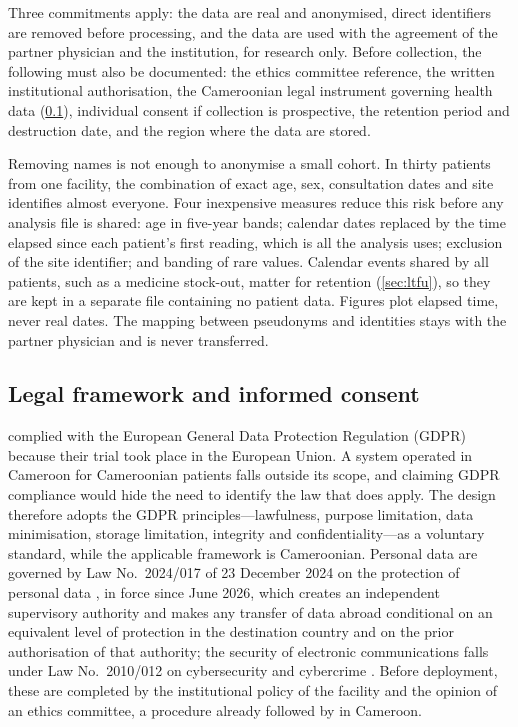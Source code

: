Three commitments apply: the data are real and anonymised, direct identifiers are removed before processing, and the data are used with the agreement of the partner physician and the institution, for research only. Before collection, the following must also be documented: the ethics committee reference, the written institutional authorisation, the Cameroonian legal instrument governing health data (\cref{sec:legal}), individual consent if collection is prospective, the retention period and destruction date, and the region where the data are stored.

Removing names is not enough to anonymise a small cohort. In thirty patients from one facility, the combination of exact age, sex, consultation dates and site identifies almost everyone. Four inexpensive measures reduce this risk before any analysis file is shared: age in five-year bands; calendar dates replaced by the time elapsed since each patient's first reading, which is all the analysis uses; exclusion of the site identifier; and banding of rare values. Calendar events shared by all patients, such as a medicine stock-out, matter for retention (\cref{sec:ltfu}), so they are kept in a separate file containing no patient data. Figures plot elapsed time, never real dates. The mapping between pseudonyms and identities stays with the partner physician and is never transferred.

\subsection{Legal framework and informed consent}\label{sec:legal}\label{sec:gdpr}\label{sec:applicable-law}\label{sec:residency}\label{sec:consent}

\Textcite{mihevc2025} complied with the European General Data Protection Regulation (GDPR) because their trial took place in the European Union. A system operated in Cameroon for Cameroonian patients falls outside its scope, and claiming GDPR compliance would hide the need to identify the law that does apply. The design therefore adopts the GDPR principles---lawfulness, purpose limitation, data minimisation, storage limitation, integrity and confidentiality---as a voluntary standard, while the applicable framework is Cameroonian. Personal data are governed by Law No.~2024/017 of 23 December 2024 on the protection of personal data \parencite{cameroon2024data}, in force since June 2026, which creates an independent supervisory authority and makes any transfer of data abroad conditional on an equivalent level of protection in the destination country and on the prior authorisation of that authority; the security of electronic communications falls under Law No.~2010/012 on cybersecurity and cybercrime \parencite{cameroon2010cyber}. Before deployment, these are completed by the institutional policy of the facility and the opinion of an ethics committee, a procedure already followed by \textcite{bediang2021} in Cameroon.

